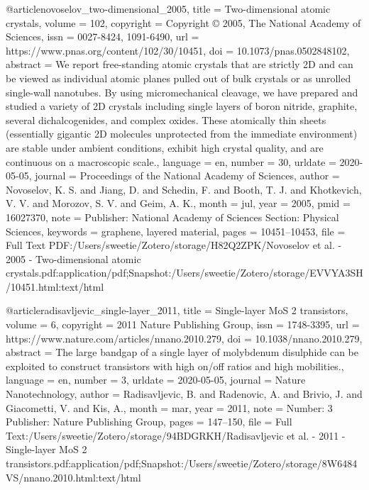 {@article{novoselov_two-dimensional_2005,
	title = {Two-dimensional atomic crystals},
	volume = {102},
	copyright = {Copyright © 2005, The National Academy of Sciences},
	issn = {0027-8424, 1091-6490},
	url = {https://www.pnas.org/content/102/30/10451},
	doi = {10.1073/pnas.0502848102},
	abstract = {We report free-standing atomic crystals that are strictly 2D and can be viewed as individual atomic planes pulled out of bulk crystals or as unrolled single-wall nanotubes. By using micromechanical cleavage, we have prepared and studied a variety of 2D crystals including single layers of boron nitride, graphite, several dichalcogenides, and complex oxides. These atomically thin sheets (essentially gigantic 2D molecules unprotected from the immediate environment) are stable under ambient conditions, exhibit high crystal quality, and are continuous on a macroscopic scale.},
	language = {en},
	number = {30},
	urldate = {2020-05-05},
	journal = {Proceedings of the National Academy of Sciences},
	author = {Novoselov, K. S. and Jiang, D. and Schedin, F. and Booth, T. J. and Khotkevich, V. V. and Morozov, S. V. and Geim, A. K.},
	month = jul,
	year = {2005},
	pmid = {16027370},
	note = {Publisher: National Academy of Sciences
Section: Physical Sciences},
	keywords = {graphene, layered material},
	pages = {10451--10453},
	file = {Full Text PDF:/Users/sweetie/Zotero/storage/H82Q2ZPK/Novoselov et al. - 2005 - Two-dimensional atomic crystals.pdf:application/pdf;Snapshot:/Users/sweetie/Zotero/storage/EVVYA3SH/10451.html:text/html}
}

@article{radisavljevic_single-layer_2011,
	title = {Single-layer {MoS} 2 transistors},
	volume = {6},
	copyright = {2011 Nature Publishing Group},
	issn = {1748-3395},
	url = {https://www.nature.com/articles/nnano.2010.279},
	doi = {10.1038/nnano.2010.279},
	abstract = {The large bandgap of a single layer of molybdenum disulphide can be exploited to construct transistors with high on/off ratios and high mobilities.},
	language = {en},
	number = {3},
	urldate = {2020-05-05},
	journal = {Nature Nanotechnology},
	author = {Radisavljevic, B. and Radenovic, A. and Brivio, J. and Giacometti, V. and Kis, A.},
	month = mar,
	year = {2011},
	note = {Number: 3
Publisher: Nature Publishing Group},
	pages = {147--150},
	file = {Full Text:/Users/sweetie/Zotero/storage/94BDGRKH/Radisavljevic et al. - 2011 - Single-layer MoS 2 transistors.pdf:application/pdf;Snapshot:/Users/sweetie/Zotero/storage/8W6484VS/nnano.2010.html:text/html}
}

}

